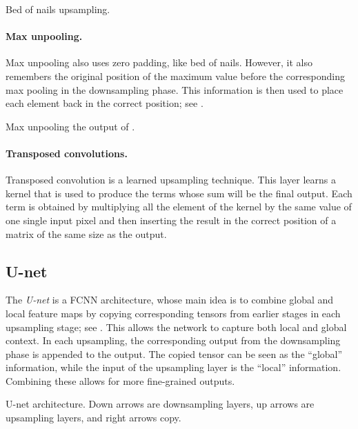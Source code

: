 \begin{marginfigure}
    \centering
    \caption{Bed of nails upsampling.}
    \label{fig:bed-of-nails-upsampling}
\end{marginfigure}

\paragraph{Max unpooling.}

Max unpooling also uses zero padding, like bed of nails. However, it also remembers the original
position of the maximum value before the corresponding max pooling in the downsampling phase. This
information is then used to place each element back in the correct position; see
.

\begin{marginfigure}
    \centering
    \caption{Max unpooling the output of .}
    \label{fig:max-unpooling}
\end{marginfigure}

\paragraph{Transposed convolutions.}

Transposed convolution is a learned upsampling technique. This layer learns a kernel that is used
to produce the terms whose sum will be the final output. Each term is obtained by multiplying all
the element of the kernel by the same value of one single input pixel and then inserting the result
in the correct position of a matrix of the same size as the output.

\subsection{U-net}

The \textit{U-net} is a FCNN architecture, whose main idea is to combine global and local feature
maps by copying corresponding tensors from earlier stages in each upsampling stage; see
. This allows the network to capture both local and global context. In each
upsampling, the corresponding output from the downsampling phase is appended to the output. The
copied tensor can be seen as the ``global'' information, while the input of the upsampling layer is
the ``local'' information. Combining these allows for more fine-grained outputs.

\begin{marginfigure}
    \centering
    \caption{U-net architecture. Down arrows are downsampling layers, up arrows are upsampling layers, and right arrows copy.}
    \label{fig:u-net}
\end{marginfigure}

